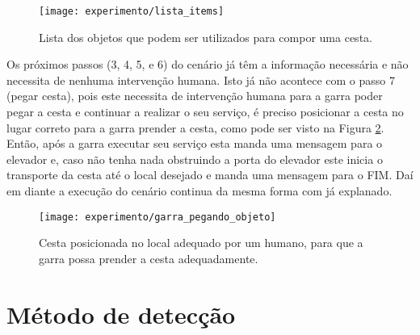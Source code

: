 \begin{figure}[!htb] \centering 
  \centering
  \texttt{[image: experimento/lista\_items]} 
  \caption{Lista dos objetos que podem ser utilizados para compor uma cesta.} 
  \label{fig:lista_objetos}
\end{figure}

Os próximos passos (3, 4, 5, e 6) do cenário já têm a informação necessária e não necessita de nenhuma intervenção humana. Isto já não acontece com o passo 7 (pegar cesta), pois este necessita de intervenção humana para a garra poder pegar a cesta e continuar a realizar o seu serviço, é preciso posicionar a cesta no lugar correto para a garra prender a cesta, como pode ser visto na Figura \ref{fig:garra_pegando_objeto}. Então, após a garra executar seu serviço esta manda uma mensagem para o elevador e, caso não tenha nada obstruindo a porta do elevador este inicia o transporte da cesta até o local desejado e manda uma mensagem para o FIM. Daí em diante a execução do cenário continua da mesma forma com já explanado.

\begin{figure}[!htb] \centering 
  \centering
  \texttt{[image: experimento/garra\_pegando\_objeto]} 
  \caption{Cesta posicionada no local adequado por um humano, para que a garra possa prender a cesta adequadamente.} 
  \label{fig:garra_pegando_objeto}
\end{figure}

\section{Método de detecção}
